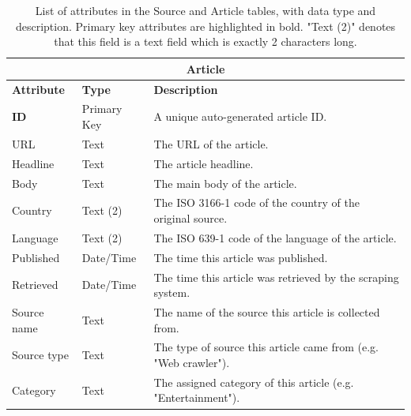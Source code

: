 \documentclass{l4proj}
\begin{document}
\begin{table}[h]
\begin{tabular}{lll}
\multicolumn{3}{c}{\textbf{Article}}                                                                                                                                     \\ \hline
\textbf{Attribute} & \textbf{Type} & \textbf{Description}                                                                                                                \\ \hline
\textbf{ID}        & Primary Key   & A unique auto-generated article ID.                                                                                                 \\
URL                & Text          & The URL of the article.                                                                                                              \\
Headline           & Text          & The article headline.                                                                                                                \\
Body               & Text          & The main body of the article.                                                                                                        \\
Country            & Text (2)      & The ISO 3166-1 code of the country of the original source.                                                                           \\
Language           & Text (2)      & The ISO 639-1 code of the language of the article.                                                                                   \\
Published          & Date/Time     & The time this article was published.                                                                                                \\
Retrieved          & Date/Time     & The time this article was retrieved by the scraping system.                                                                          \\
Source name        & Text          & The name of the source this article is collected from.                                                                               \\
Source type        & Text          & The type of source this article came from (e.g. "Web crawler").                                                                      \\
Category           & Text          & The assigned category of this article (e.g. "Entertainment").                                                                        \\ \hline
\end{tabular}
\caption{List of attributes in the Source and Article tables, with data type and description. Primary key attributes are highlighted in bold. "Text (2)" denotes that this field is a text field which is exactly 2 characters long.}
\label{table:schema}
\end{table}
\end{document}
